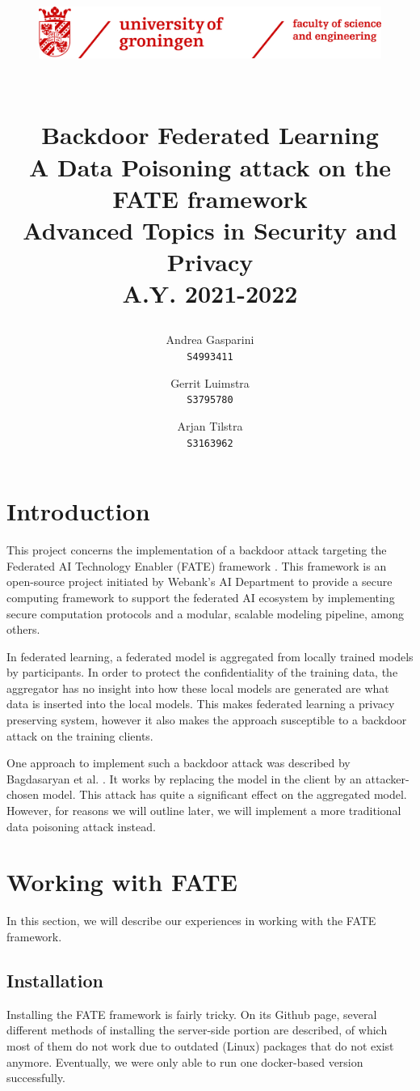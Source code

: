 \documentclass{article}
\title{
    \begin{figure}[h]
        \centering
        \includegraphics[width=.9\textwidth]{assets/rugr_fse_logoen_rood_rgb.png}
    \end{figure}
    \\[0.5cm]
    Backdoor Federated Learning
    \\
    {\Large A Data Poisoning attack on the FATE framework}
    \\[0.5cm]
    {\large \textbf{Advanced Topics in Security and Privacy}}
    \\
    {\large A.Y. 2021-2022}
    \\[0.25cm]
}
\author{
    Andrea Gasparini \\ \texttt{S4993411}
    \and
    Gerrit Luimstra \\ \texttt{S3795780}
    \and
    Arjan Tilstra \\ \texttt{S3163962}
}
\date{}
\begin{document}
\maketitle
\tableofcontents
\newpage

\section{Introduction}
This project concerns the implementation of a backdoor attack targeting the Federated AI Technology Enabler (FATE) framework \cite{fate_2019}. This framework is an open-source project initiated by Webank's AI Department to provide a secure computing framework to support the federated AI ecosystem by implementing secure computation protocols and a modular, scalable modeling pipeline, among others.

In federated learning, a federated model is aggregated from locally trained models by participants. In order to protect the confidentiality of the training data, the aggregator has no insight into how these local models are generated are what data is inserted into the local models. This makes federated learning a privacy preserving system, however it also makes the approach susceptible to a backdoor attack on the training clients.

One approach to implement such a backdoor attack was described by Bagdasaryan et al. \cite{DBLP:journals/corr/abs-1807-00459}. It works by replacing the model in the client by an attacker-chosen model. This attack has quite a significant effect on the aggregated model. However, for reasons we will outline later, we will implement a more traditional data poisoning attack instead.

\section{Working with FATE}
In this section, we will describe our experiences in working with the FATE framework. 

\subsection{Installation}
Installing the FATE framework is fairly tricky. On its Github page, several different methods of installing the server-side portion are described, of which most of them do not work due to outdated (Linux) packages that do not exist anymore. Eventually, we were only able to run one docker-based version successfully.
\end{document}
